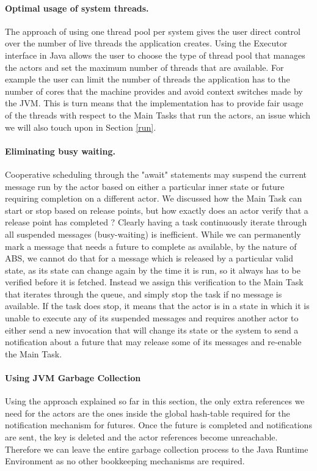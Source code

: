 \paragraph{Optimal usage of system threads.}
The approach of using one thread pool per system gives the user direct control over the number of live threads the application creates. Using the Executor interface in Java allows the user to choose the type of thread pool that manages the actors and set the maximum number of threads that are available. For example the user can limit the number of threads the application has to the number of cores that the machine provides and avoid context switches made by the JVM. This is turn means that the implementation has to provide fair usage of the threads with respect to the Main Tasks that run the actors, an issue which we will also touch upon in Section \ref{run}. 

\paragraph{Eliminating busy waiting.}
Cooperative scheduling through the "await" statements may suspend the current message run by the actor based on either a particular inner state or future requiring completion on a different actor. We discussed how the Main Task can start or stop based on release points, but how exactly does an actor verify that a release point has completed ? Clearly having a task continuously iterate through all suspended messages (busy-waiting) is inefficient. While we can permanently mark a message that needs a future to complete as available, by the nature of ABS, we cannot do that for a message which is released by a particular valid state, as its state can change again by the time it is run, so it always has to be verified before it is fetched. Instead we assign this verification to the Main Task that iterates through the queue, and simply stop the task if no message is available. If the task does stop, it means that the actor is in a state in which it is unable to execute any of its suspended messages and requires another actor to either send a new invocation that will change its state or the system to send a notification about a future that may release some of its messages and re-enable the Main Task. 


\paragraph{Using JVM Garbage Collection}
Using the approach explained so far in this section, the only extra references we need for the actors are the ones inside the global hash-table required for the notification mechanism for futures. Once the future is completed and notifications are sent, the key is deleted and the actor references become unreachable. Therefore we can leave the entire garbage collection process to the Java Runtime Environment as no other bookkeeping mechanisms are required.


